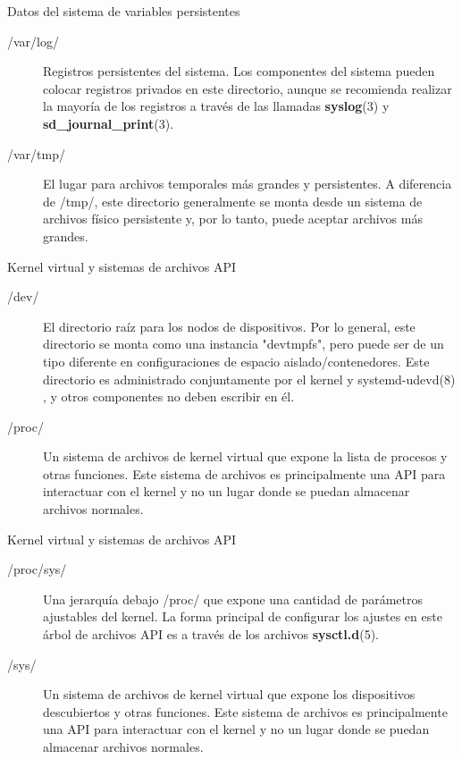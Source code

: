 \begin{frame}[c]{Datos del sistema de variables persistentes}
  \begin{description}
    \item [/var/log/] Registros persistentes del sistema. Los componentes del
      sistema pueden colocar registros privados en este directorio, aunque se
      recomienda realizar la mayoría de los registros a través de las
      llamadas \textbf{syslog}(3)  y \textbf{sd\_journal\_print}(3).
    \pausa
    \item [/var/tmp/] El lugar para archivos temporales más grandes y
      persistentes. A diferencia de /tmp/, este directorio generalmente se
      monta desde un sistema de archivos físico persistente y, por lo tanto,
      puede aceptar archivos más grandes.
  \end{description}
\end{frame}

\begin{frame}[c]{Kernel virtual y sistemas de archivos API}
  \begin{description}
    \item [/dev/] El directorio raíz para los nodos de dispositivos. Por lo
      general, este directorio se monta como una instancia "devtmpfs", pero
      puede ser de un tipo diferente en configuraciones de espacio
      aislado/contenedores. Este directorio es administrado conjuntamente por
      el kernel y systemd-udevd(8) , y otros componentes no deben escribir
      en él.
    \pausa
    \item [/proc/] Un sistema de archivos de kernel virtual que expone la
      lista de procesos y otras funciones. Este sistema de archivos es
      principalmente una API para interactuar con el kernel y no un lugar
      donde se puedan almacenar archivos normales.
  \end{description}
\end{frame}

\begin{frame}[c]{Kernel virtual y sistemas de archivos API}
  \begin{description}
    \item [/proc/sys/] Una jerarquía debajo /proc/ que expone una cantidad de
      parámetros ajustables del kernel. La forma principal de configurar los
      ajustes en este árbol de archivos API es a través de los archivos
      \textbf{sysctl.d}(5).
    \pausa
    \item [/sys/] Un sistema de archivos de kernel virtual que expone los
      dispositivos descubiertos y otras funciones. Este sistema de archivos es
      principalmente una API para interactuar con el kernel y no un lugar
      donde se puedan almacenar archivos normales.
  \end{description}
\end{frame}

